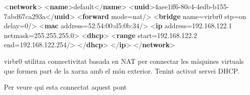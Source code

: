 \documentclass[
  10pt,
]{krantz}
\newenvironment{Shaded}{\begin{snugshade}}{\end{snugshade}}
\newcommand{\ExtensionTok}[1]{#1}
\newcommand{\KeywordTok}[1]{\textcolor[rgb]{0.13,0.29,0.53}{\textbf{#1}}}
\newcommand{\NormalTok}[1]{#1}
\newcommand{\OperatorTok}[1]{\textcolor[rgb]{0.81,0.36,0.00}{\textbf{#1}}}
\newcommand{\OtherTok}[1]{\textcolor[rgb]{0.56,0.35,0.01}{#1}}
\newcommand{\StringTok}[1]{\textcolor[rgb]{0.31,0.60,0.02}{#1}}
\begin{document}
\begin{Shaded}
\begin{Highlighting}[]
\NormalTok{\textless{}}\KeywordTok{network}\NormalTok{\textgreater{}}
\NormalTok{  \textless{}}\KeywordTok{name}\NormalTok{\textgreater{}default\textless{}/}\KeywordTok{name}\NormalTok{\textgreater{}}
\NormalTok{  \textless{}}\KeywordTok{uuid}\NormalTok{\textgreater{}4aee1ff6{-}80c4{-}4edb{-}b155{-}7abd67ca293a\textless{}/}\KeywordTok{uuid}\NormalTok{\textgreater{}}
\NormalTok{  \textless{}}\KeywordTok{forward}\OtherTok{ mode=}\StringTok{\textquotesingle{}nat\textquotesingle{}}\NormalTok{/\textgreater{}}
\NormalTok{  \textless{}}\KeywordTok{bridge}\OtherTok{ name=}\StringTok{\textquotesingle{}virbr0\textquotesingle{}}\OtherTok{ stp=}\StringTok{\textquotesingle{}on\textquotesingle{}}\OtherTok{ delay=}\StringTok{\textquotesingle{}0\textquotesingle{}}\NormalTok{/\textgreater{}}
\NormalTok{  \textless{}}\KeywordTok{mac}\OtherTok{ address=}\StringTok{\textquotesingle{}52:54:00:d5:0b:34\textquotesingle{}}\NormalTok{/\textgreater{}}
\NormalTok{  \textless{}}\KeywordTok{ip}\OtherTok{ address=}\StringTok{\textquotesingle{}192.168.122.1\textquotesingle{}}\OtherTok{ netmask=}\StringTok{\textquotesingle{}255.255.255.0\textquotesingle{}}\NormalTok{\textgreater{}}
\NormalTok{    \textless{}}\KeywordTok{dhcp}\NormalTok{\textgreater{}}
\NormalTok{      \textless{}}\KeywordTok{range}\OtherTok{ start=}\StringTok{\textquotesingle{}192.168.122.2\textquotesingle{}}\OtherTok{ end=}\StringTok{\textquotesingle{}192.168.122.254\textquotesingle{}}\NormalTok{/\textgreater{}}
\NormalTok{    \textless{}/}\KeywordTok{dhcp}\NormalTok{\textgreater{}}
\NormalTok{  \textless{}/}\KeywordTok{ip}\NormalTok{\textgreater{}}
\NormalTok{\textless{}/}\KeywordTok{network}\NormalTok{\textgreater{}}
\end{Highlighting}
\end{Shaded}

virbr0 utilitza connectivitat basada en NAT per connectar les màquines virtuals que formen part de la xarxa amb el món exterior. Tenint activat servei DHCP.

Per veure qui esta connectat aquest pont

\begin{Shaded}
\end{Shaded}
\end{document}
